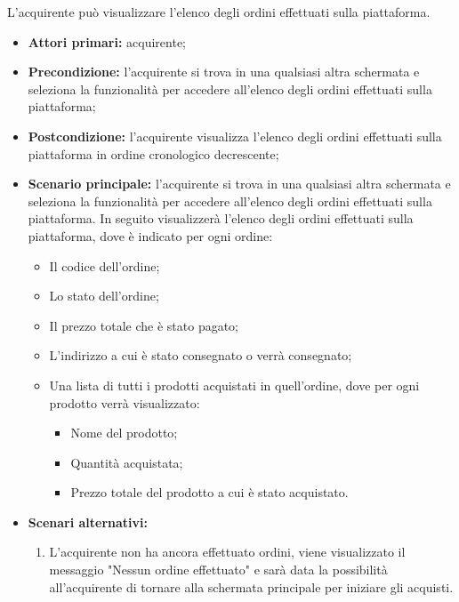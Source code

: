 
\label{visualizzazione-ordini-effettuati}

L'acquirente può visualizzare l'elenco degli ordini effettuati sulla piattaforma.
\begin{itemize}
    \item \textbf{Attori primari:} acquirente;
    \item \textbf{Precondizione:} l'acquirente si trova in una qualsiasi altra schermata e seleziona la funzionalità per accedere all'elenco degli ordini effettuati sulla piattaforma;
    \item \textbf{Postcondizione:} l'acquirente visualizza l'elenco degli ordini effettuati sulla piattaforma in ordine cronologico decrescente;
    \item \textbf{Scenario principale:} l'acquirente si trova in una qualsiasi altra schermata e seleziona la funzionalità per accedere all'elenco degli ordini effettuati sulla piattaforma. In seguito visualizzerà l'elenco degli ordini effettuati sulla piattaforma, dove è indicato per ogni ordine:
    \begin{itemize}
        \item Il codice dell'ordine;
        \item Lo stato dell'ordine;
        \item Il prezzo totale che è stato pagato;
        \item L'indirizzo a cui è stato consegnato o verrà consegnato;
        \item Una lista di tutti i prodotti acquistati in quell'ordine, dove per ogni prodotto verrà visualizzato:
        \begin{itemize}
            \item Nome del prodotto;
            \item Quantità acquistata;
            \item Prezzo totale del prodotto a cui è stato acquistato.
        \end{itemize}
    \end{itemize}
    \item \textbf{Scenari alternativi:} 
    \begin{enumerate}[label=\lett]
        \item L'acquirente non ha ancora effettuato ordini, viene visualizzato il messaggio "Nessun ordine effettuato" e sarà data la possibilità all'acquirente di tornare alla schermata principale per iniziare gli acquisti.
    \end{enumerate}
\end{itemize}


